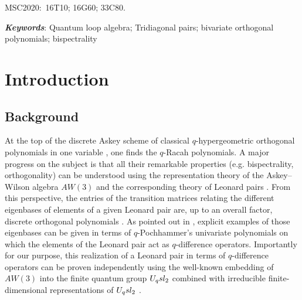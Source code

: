 \documentclass[11pt]{amsart}
\numberwithin{equation}{section}
\numberwithin{equation}{section}
\begin{document}
	\maketitle
	
\vskip -0.5cm
	
{\small MSC2020:\  16T10; 16G60; 33C80.}
	
	
{{\small  {\it \bf Keywords}: Quantum loop algebra; Tridiagonal pairs; bivariate orthogonal polynomials; bispectrality}}
	
	\tableofcontents

\section{Introduction}  
\subsection{Background} At the top of the discrete Askey scheme of classical $q$-hypergeometric orthogonal polynomials in one variable \cite{AW79,K10}, one finds
the $q$-Racah polynomials. A major progress on the subject is that all their remarkable properties (e.g. bispectrality, orthogonality) can be understood using the representation theory of the Askey–Wilson algebra $AW(3)$ \cite{Z91} and the corresponding theory of Leonard pairs \cite{T87,T04,Ter04}. From this perspective, the entries of the transition 
matrices relating the different eigenbases of elements of a given Leonard pair are, up to an overall factor, discrete orthogonal polynomials \cite{Ter04}.
As pointed out in \cite[Rem.\,2.1]{Ros07}, explicit examples of those eigenbases can be given in terms of $q$-Pochhammer's univariate polynomials on which 
the elements of the Leonard pair act as $q$-difference operators. 
Importantly for our purpose, this realization of a Leonard pair in terms of $q$-difference operators can be proven independently  
using the well-known embedding of $AW(3)$ into the finite quantum group $U_q sl_2$ \cite{GZ93} combined with irreducible finite-dimensional representations of $U_q sl_2$ \cite{WZ}.
\end{document}
